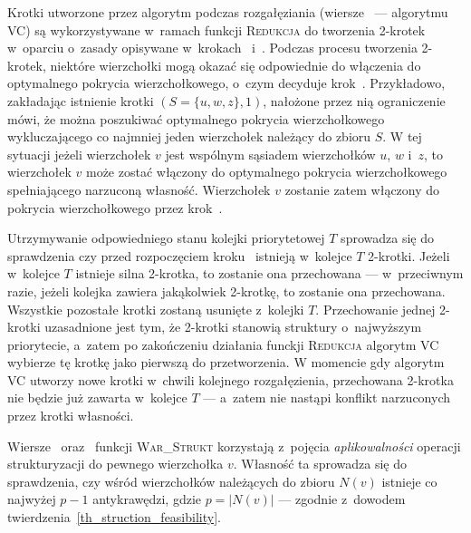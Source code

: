 \par{
  Krotki utworzone przez algorytm podczas rozgałęziania (wiersze~ ---  algorytmu \textsc{VC}) są wykorzystywane w~ramach funkcji \textsc{Redukcja} do tworzenia 2-krotek w~oparciu o~zasady opisywane w~krokach~ i~.
  Podczas procesu tworzenia 2-krotek, niektóre wierzchołki mogą okazać się odpowiednie do włączenia do optymalnego pokrycia wierzchołkowego, o~czym decyduje krok~.
  Przykładowo, zakładając istnienie krotki $(S=\{u, w, z\}, 1)$, nałożone przez nią ograniczenie mówi, że można poszukiwać optymalnego pokrycia wierzchołkowego wykluczającego co najmniej jeden wierzchołek należący do zbioru $S$.
  W tej sytuacji jeżeli wierzchołek $v$ jest wspólnym sąsiadem wierzchołków $u$, $w$ i~$z$, to wierzchołek $v$ może zostać włączony do optymalnego pokrycia wierzchołkowego spełniającego narzuconą własność.
  Wierzchołek $v$ zostanie zatem włączony do pokrycia wierzchołkowego przez krok~.

  Utrzymywanie odpowiedniego stanu kolejki priorytetowej $T$ sprowadza się do sprawdzenia czy przed rozpoczęciem kroku~ istnieją w~kolejce $T$ 2-krotki.
  Jeżeli w~kolejce $T$ istnieje silna 2-krotka, to zostanie ona przechowana --- w~przeciwnym razie, jeżeli kolejka zawiera jakąkolwiek 2-krotkę, to zostanie ona przechowana.
  Wszystkie pozostałe krotki zostaną usunięte z~kolejki $T$.
  Przechowanie jednej 2-krotki uzasadnione jest tym, że 2-krotki stanowią struktury o~najwyższym priorytecie, a~zatem po zakończeniu działania funckji \textsc{Redukcja} algorytm \textsc{VC} wybierze tę krotkę jako pierwszą do przetworzenia.
  W momencie gdy algorytm \textsc{VC} utworzy nowe krotki w~chwili kolejnego rozgałęzienia, przechowana 2-krotka nie będzie już zawarta w~kolejce $T$ --- a~zatem nie nastąpi konflikt narzuconych przez krotki własności.

  Wiersze~ oraz~ funkcji \textsc{War\_Strukt} korzystają z~pojęcia \emph{aplikowalności} operacji strukturyzacji do pewnego wierzchołka $v$.
  Własność ta sprowadza się do sprawdzenia, czy wśród wierzchołków należących do zbioru $N(v)$ istnieje co najwyżej $p-1$ antykrawędzi, gdzie $p=|N(v)|$ --- zgodnie z~dowodem twierdzenia~\ref{th_struction_feasibility}.
}
